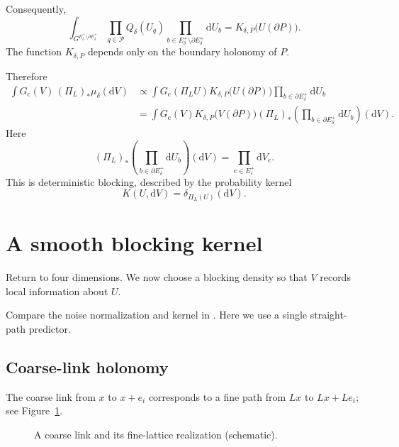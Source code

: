 \documentclass[10pt,reqno]{amsart}
\theoremstyle{definition}
\theoremstyle{remark}
\numberwithin{equation}{section}
\numberwithin{figure}{section}
\newcommand{\dd}{\mathrm d}
\newcommand{\e}{\varepsilon}
\newcommand{\Gc}{G_{\mathrm c}}
\begin{document}
Consequently,
\begin{equation}\label{eq:display-047}
\int_{G^{E_\delta^+\setminus\partial E_\delta^+}}
\prod_{q\in\mathcal P}Q_\delta(U_q)
\prod_{b\in E_\delta^+\setminus\partial E_\delta^+}\dd U_b
=K_{\delta,P}\bigl(U(\partial P)\bigr).
\end{equation}
The function $K_{\delta,P}$ depends only on the boundary holonomy of $P$.

Therefore
\begin{equation}\label{eq:display-048}
\begin{aligned}
\int\Gc(V)\,(\Pi_L)_*\mu_\delta(\dd V)
&\propto\int\Gc(\Pi_LU)K_{\delta,P}\bigl(U(\partial P)\bigr)
\prod_{b\in\partial E_\delta^+}\dd U_b\\
&=\int\Gc(V)K_{\delta,P}\bigl(V(\partial P)\bigr)
(\Pi_L)_*\left(\prod_{b\in\partial E_\delta^+}\dd U_b\right)(\dd V).
\end{aligned}
\end{equation}
Here
\begin{equation}\label{eq:display-049}
(\Pi_L)_*\left(\prod_{b\in\partial E_\delta^+}\dd U_b\right)(\dd V)
=\prod_{e\in E_\e^+}\dd V_e.
\end{equation}
This is deterministic blocking, described by the probability kernel
\begin{equation}\label{eq:display-050}
K(U,\dd V)=\delta_{\Pi_L(U)}(\dd V).
\end{equation}

\section{A smooth blocking kernel}
Return to four dimensions. We now choose a blocking density so that $V$ records local information about $U$.

Compare the noise normalization and kernel in
\cite[Section~11, (11.1)--(11.2), p.~36]{Exposition}.
Here we use a single straight-path predictor.\par\smallskip

\subsection{Coarse-link holonomy}

The coarse link from $x$ to $x+e_i$ corresponds to a fine path from $Lx$ to $Lx+Le_i$; see Figure~\ref{fig:coarse-link}.

\begin{figure}[htbp]
\centering
{}
\caption{A coarse link and its fine-lattice realization (schematic).}
\label{fig:coarse-link}
\end{figure}
\end{document}
